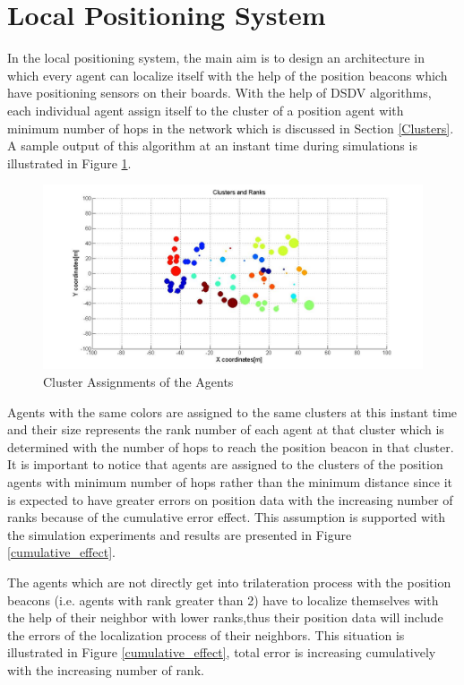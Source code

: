 \section{Local Positioning System} \label{lps_ref}
In the local positioning system, the main aim is to design an architecture in which every agent can localize itself with the help of the position beacons which have positioning sensors on their boards. With the help of DSDV algorithms, each individual agent assign itself to the cluster of a position agent with minimum number of hops in the network which is discussed in Section \ref{Clusters}. A sample output of this algorithm at an instant time during simulations is illustrated in Figure \ref{Cluster_figure}. 
	
\begin{figure}[H]
\caption{Cluster Assignments of the Agents} \label{Cluster_figure}
\centerline{\includegraphics[scale = 0.4]{Clusters_Ranks_1}}
\end{figure} 

Agents with the same colors are assigned to the same clusters at this instant time and their size represents the rank number of each agent at that cluster which is determined with the number of hops to reach the position beacon in that cluster. It is important to notice that agents are assigned to the clusters of the position agents with minimum number of hops rather than the minimum distance since it is expected to have greater errors on position data with the increasing number of ranks because of the cumulative error effect. This assumption is supported with the simulation experiments and results are presented in Figure \ref{cumulative_effect}. 

The agents which are not directly get into trilateration process with the position beacons (i.e. agents with rank greater than 2) have to localize themselves with the help of their neighbor with lower ranks,thus their position data will include the errors of the localization process of their neighbors. This situation is illustrated in Figure \ref{cumulative_effect}, total error is increasing cumulatively with the increasing number of rank. 
	
